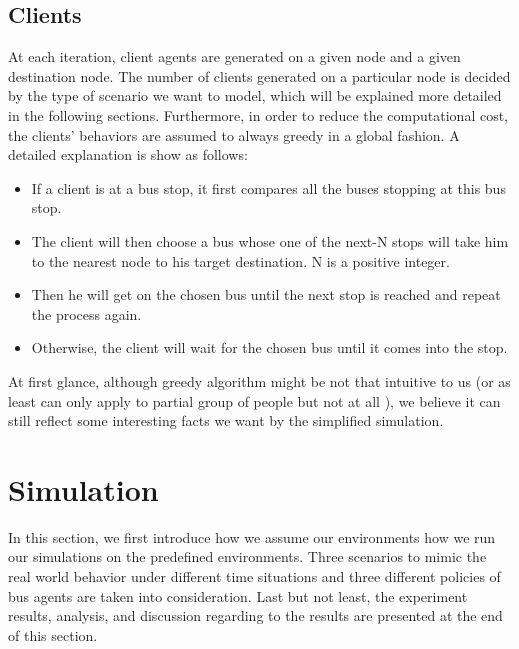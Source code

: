 \documentclass{sig-alternate}
\begin{document}
\subsection{Clients}
At each iteration, client agents are generated on a given node and a given destination node.
The number of clients generated on a particular node is decided by the type of scenario we want to model, which will be explained more detailed in the following sections.
Furthermore, in order to reduce the computational cost, the clients' behaviors are assumed to always greedy in a global fashion.
A detailed explanation is show as follows:
\begin{itemize}
\item If a client is at a bus stop, it first compares all the buses stopping at this bus stop.
\item The client will then choose a bus whose one of the next-N stops will take him to the nearest node to his target destination. N is a positive integer. 
\item Then he will get on the chosen bus until the next stop is reached and repeat the process again.
\item Otherwise, the client will wait for the chosen bus until it comes into the stop.
\end{itemize}
At first glance, although greedy algorithm might be not that intuitive to us (or as least can only apply to partial group of people but not at all ),
we believe it can still reflect some interesting facts we want by the simplified simulation.


\section{Simulation}
In this section, we first introduce how we assume our environments how we run our simulations on the predefined environments.
Three scenarios to mimic the real world behavior under different time situations  and three different policies of bus agents are taken into consideration.
Last but not least, the experiment results, analysis, and discussion regarding to the results are presented at the end of this section.
\end{document}
